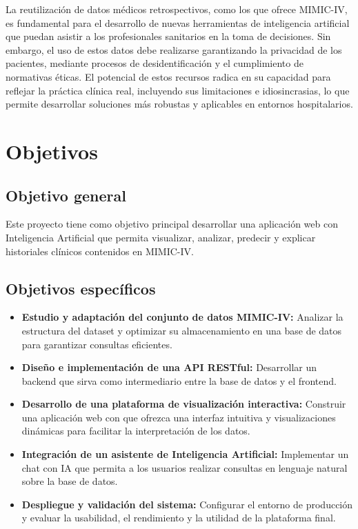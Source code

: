 La reutilización de datos médicos retrospectivos, como los que ofrece MIMIC-IV, es fundamental para el desarrollo de nuevas herramientas de inteligencia artificial que puedan asistir a los profesionales sanitarios en la toma de decisiones. Sin embargo, el uso de estos datos debe realizarse garantizando la privacidad de los pacientes, mediante procesos de desidentificación y el cumplimiento de normativas éticas. El potencial de estos recursos radica en su capacidad para reflejar la práctica clínica real, incluyendo sus limitaciones e idiosincrasias, lo que permite desarrollar soluciones más robustas y aplicables en entornos hospitalarios.

\section{Objetivos}

\subsection{Objetivo general}

Este proyecto tiene como objetivo principal desarrollar una aplicación web con Inteligencia Artificial que permita visualizar, analizar, predecir y explicar historiales clínicos contenidos en MIMIC-IV.

\subsection{Objetivos específicos}

\begin{itemize}
    \item \textbf{Estudio y adaptación del conjunto de datos MIMIC-IV:} Analizar la estructura del dataset y optimizar su almacenamiento en una base de datos para garantizar consultas eficientes.
    \item \textbf{Diseño e implementación de una API RESTful:} Desarrollar un backend que sirva como intermediario entre la base de datos y el frontend.
    \item \textbf{Desarrollo de una plataforma de visualización interactiva:} Construir una aplicación web con que ofrezca una interfaz intuitiva y visualizaciones dinámicas para facilitar la interpretación de los datos.
    \item \textbf{Integración de un asistente de Inteligencia Artificial:} Implementar un chat con IA que permita a los usuarios realizar consultas en lenguaje natural sobre la base de datos.
    \item \textbf{Despliegue y validación del sistema:} Configurar el entorno de producción y evaluar la usabilidad, el rendimiento y la utilidad de la plataforma final.
\end{itemize}

